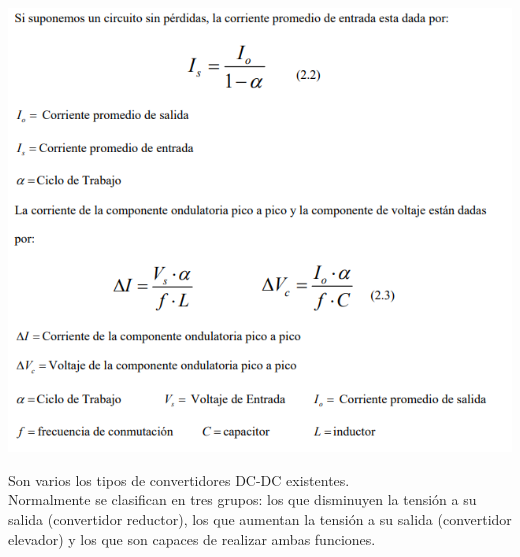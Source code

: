 \documentclass[12pt,a4paper]{article}
\begin{document}
\begin{flushleft}
\begin{center}
\includegraphics[scale=1]{imagenes/cdcd3.PNG} 
\end{center}
\end{flushleft}
Son varios los tipos de convertidores DC-DC existentes.\\ Normalmente se clasifican en tres grupos: los que disminuyen la tensión a su salida (convertidor reductor), los que aumentan la tensión a su salida (convertidor elevador) y los que son capaces de realizar ambas funciones.\\
\newpage
\end{document}
